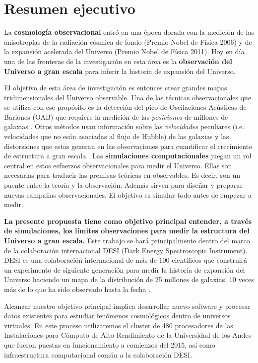 
\section{Resumen ejecutivo}

La {\bf cosmología observacional} entró en una época dorada con la medición
de las anisotropías de la radiación cósmica de fondo (Premio Nobel de
Física 2006) y de la expansión acelerada del Universo
(Premio Nobel de Física 2011).  
Hoy en d\'ia una de las fronteras de la investigación en esta \'area 
es la {\bf observaci\'on del Universo a gran escala} para inferir la
historia de expansión  del Universo.   

El objetivo de esta \'area de investigaci\'on es entonces crear
grandes mapas tridimensionales del Universo observable. 
Una de las t\'ecnicas observacionales que se utiliza con ese
prop\'osito es la detecci\'on del pico de Oscilaciones Ac\'usticas de
Bariones (OAB) que requiere la medici\'on de las \emph{posiciones} de
millones de galaxias \cite{Eisenstein2005}. 
Otros m\'etodos usan informaci\'on sobre las \emph{velocidades}
peculiares (i.e. velocidades que no es\'an asociadas al flujo de
Hubble) de las galaxias y las distorsiones que estas generan en las
observaciones para cuantificar el crecimiento de estructura a gran
escala \cite{Scoccimarro2004}. 
Las {\bf simulaciones computacionales}
juegan un rol central en estos 
esfuerzos observacionales para medir el Universo.
Ellas son necesarias para traducir las premisas te\'oricas
en observables. 
Es decir, son un puente entre la teor\'ia y la  observaci\'on. 
Adem\'as sirven para dise\~nar y preparar 
nuevas campa\~nas observacionales.  
El objetivo es simular todo antes de empezar a medir. 


{\bf La presente propuesta tiene como objetivo principal entender, a
  trav\'es de simulaciones, los l\'imites observaciones para 
  medir la estructura del Universo a gran escala.}
  Este trabajo se har\'a principalmente dentro del marco de la
colaboraci\'on internacional DESI (Dark Energy Spectroscopic
Instrument).  DESI es una colaboraci\'on internacional de m\'as de 100
cient\'ificos que construir\'a un experimento de siguiente
generaci\'on para medir la historia de expansi\'on del Universo
haciendo un mapa de la  distribuci\'on de 25 millones de galaxias, 10
veces m\'as de lo que ha sido observado hasta la fecha \cite{DESI}. 

Alcanzar nuestro objetivo principal implica desarrollar nuevo software
y procesar datos existentes para estudiar fen\'omenos cosmol\'ogicos 
dentro de universos virtuales.
En este proceso utilizaremos el cluster de 480 procesadores de
las Instalaciones para C\'omputo de Alto Rendimiento de  la
Universidad de los Andes que fueron puestas en funcionamiento a
comienzos del 2015, as\'i como infraestructura computacional com\'un a
la colaboraci\'on DESI.
